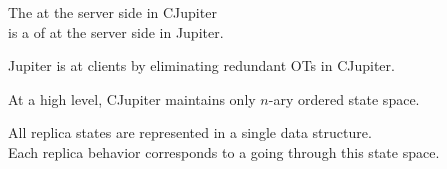 \begin{frame}{}
  \centerline{}
  \begin{prop}
    The  at the server side in CJupiter \\
    is a  of  at the server side in Jupiter.
  \end{prop}

  \pause
  \vspace{1.20cm}
  \centerline{}
  \begin{prop}
    Jupiter is  at clients by eliminating redundant OTs in CJupiter.
  \end{prop}
\end{frame}

\begin{frame}{}
  \begin{prop}
    {\large At a high level, CJupiter maintains only  $n$-ary ordered state space.}
  \end{prop}

  \begin{center}
    \resizebox{0.40\textwidth}{!}{}

    \pause
    All replica states are represented in a single data structure. \\[5pt] \pause
    Each replica behavior corresponds to a  going through this state space.
  \end{center}
\end{frame}
